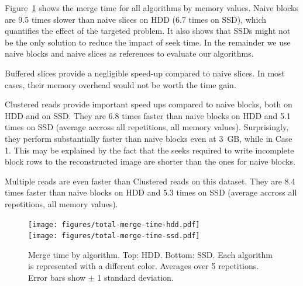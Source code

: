 \documentclass[10pt, conference, compsocconf]{IEEEtran}
\begin{document}
Figure~\ref{fig:merge-time} shows the merge time for all algorithms by
memory values. Naive blocks are 9.5 times slower than naive slices on
HDD (6.7 times on SSD), which quantifies the effect of the targeted
problem. It also shows that SSDs might not be the only solution to
reduce the impact of seek time. In the remainder we use naive blocks
and naive slices as references to evaluate our algorithms.

Buffered slices provide a negligible speed-up compared to naive
slices. In most cases, their memory overhead would not be worth the
time gain.

Clustered reads provide important speed ups compared to naive blocks,
both on HDD and on SSD. They are 6.8 times faster than naive blocks on
HDD and 5.1 times on SSD (average accross all repetitions, all memory
values). Surprisingly, they perform substantially faster than naive
blocks even at 3~GB, while in Case 1. This may be explained by the
fact that the seeks required to write incomplete block rows to the
reconstructed image are shorter than the ones for naive blocks.

Multiple reads are even faster than Clustered reads on this
dataset. They are 8.4 times faster than naive blocks on HDD and 5.3
times on SSD (average accross all repetitions, all memory values).

\begin{figure}[h]
  \centering
  \texttt{[image: figures/total-merge-time-hdd.pdf]}\\
  \texttt{[image: figures/total-merge-time-ssd.pdf]}
  \hfill
  \caption{Merge time by algorithm. Top: HDD. Bottom: SSD. Each
    algorithm is represented with a different color. Averages over 5
    repetitions. Error bars show $\pm$ 1 standard deviation. }
\label{fig:merge-time}
\end{figure}
\end{document}

